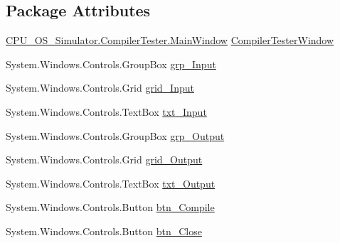 \subsection*{Package Attributes}
\begin{DoxyCompactItemize}
\item 
\hyperlink{class_c_p_u___o_s___simulator_1_1_compiler_tester_1_1_main_window}{C\+P\+U\+\_\+\+O\+S\+\_\+\+Simulator.\+Compiler\+Tester.\+Main\+Window} \hyperlink{class_c_p_u___o_s___simulator_1_1_compiler_tester_1_1_main_window_ac7b3f59a72819d2df10d4fc5f917e7e5}{Compiler\+Tester\+Window}
\item 
System.\+Windows.\+Controls.\+Group\+Box \hyperlink{class_c_p_u___o_s___simulator_1_1_compiler_tester_1_1_main_window_a057e72ce888214ee30da5048c8bdae77}{grp\+\_\+\+Input}
\item 
System.\+Windows.\+Controls.\+Grid \hyperlink{class_c_p_u___o_s___simulator_1_1_compiler_tester_1_1_main_window_a69da11a837f2a6812b815fed3d443a3e}{grid\+\_\+\+Input}
\item 
System.\+Windows.\+Controls.\+Text\+Box \hyperlink{class_c_p_u___o_s___simulator_1_1_compiler_tester_1_1_main_window_a039f9d7d428bb5d6a3b84b701f323044}{txt\+\_\+\+Input}
\item 
System.\+Windows.\+Controls.\+Group\+Box \hyperlink{class_c_p_u___o_s___simulator_1_1_compiler_tester_1_1_main_window_a94d79540c93d5a8682b5d1a64c2efc48}{grp\+\_\+\+Output}
\item 
System.\+Windows.\+Controls.\+Grid \hyperlink{class_c_p_u___o_s___simulator_1_1_compiler_tester_1_1_main_window_a142fa92ed0a755688a31bfcbd3456e59}{grid\+\_\+\+Output}
\item 
System.\+Windows.\+Controls.\+Text\+Box \hyperlink{class_c_p_u___o_s___simulator_1_1_compiler_tester_1_1_main_window_ab6483573f0239b9af7fedfd28c2b486b}{txt\+\_\+\+Output}
\item 
System.\+Windows.\+Controls.\+Button \hyperlink{class_c_p_u___o_s___simulator_1_1_compiler_tester_1_1_main_window_a760f885c40550efba330788c8f67425a}{btn\+\_\+\+Compile}
\item 
System.\+Windows.\+Controls.\+Button \hyperlink{class_c_p_u___o_s___simulator_1_1_compiler_tester_1_1_main_window_a47e8c67fa7bd86197c528d7d0800911b}{btn\+\_\+\+Close}
\end{DoxyCompactItemize}
